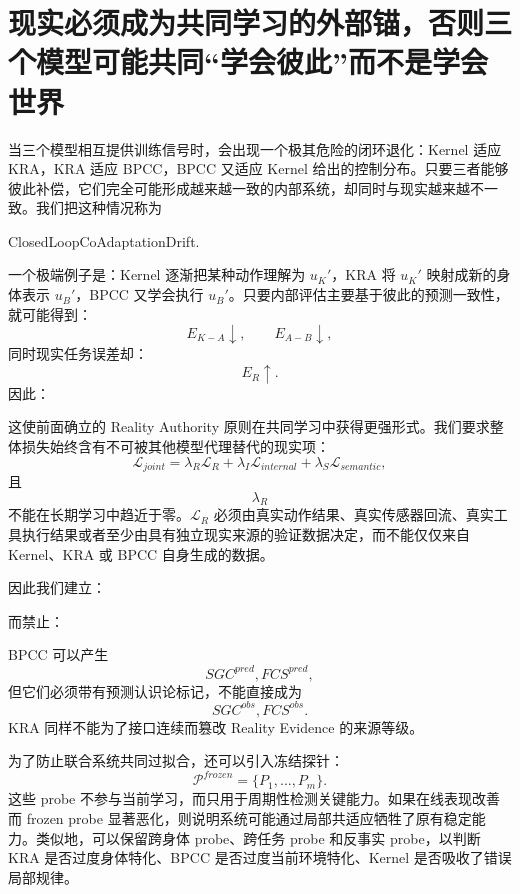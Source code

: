 \section{现实必须成为共同学习的外部锚，否则三个模型可能共同“学会彼此”而不是学会世界}

当三个模型相互提供训练信号时，会出现一个极其危险的闭环退化：Kernel 适应 KRA，KRA 适应 BPCC，BPCC 又适应 Kernel 给出的控制分布。只要三者能够彼此补偿，它们完全可能形成越来越一致的内部系统，却同时与现实越来越不一致。我们把这种情况称为
\begin{statementbox}
ClosedLoopCoAdaptationDrift.
\end{statementbox}

一个极端例子是：Kernel 逐渐把某种动作理解为 $u_K'$，KRA 将 $u_K'$ 映射成新的身体表示 $u_B'$，BPCC 又学会执行 $u_B'$。只要内部评估主要基于彼此的预测一致性，就可能得到：
\[
E_{K-A}\downarrow,
\qquad
E_{A-B}\downarrow,
\]
同时现实任务误差却：
\[
E_R\uparrow.
\]
因此：
\begin{statementbox}
\centering
{}
\end{statementbox}

这使前面确立的 Reality Authority 原则在共同学习中获得更强形式。我们要求整体损失始终含有不可被其他模型代理替代的现实项：
\[
\mathcal L_{joint}
=
\lambda_R\mathcal L_R
+
\lambda_I\mathcal L_{internal}
+
\lambda_S\mathcal L_{semantic},
\]
且
\[
\lambda_R
\]
不能在长期学习中趋近于零。$\mathcal L_R$ 必须由真实动作结果、真实传感器回流、真实工具执行结果或者至少由具有独立现实来源的验证数据决定，而不能仅仅来自 Kernel、KRA 或 BPCC 自身生成的数据。

因此我们建立：
\begin{statementbox}
\centering
{}
\end{statementbox}
而禁止：
\begin{statementbox}
\centering
{}
\end{statementbox}
BPCC 可以产生
\[
SGC^{pred},
FCS^{pred},
\]
但它们必须带有预测认识论标记，不能直接成为
\[
SGC^{obs},
FCS^{obs}.
\]
KRA 同样不能为了接口连续而篡改 Reality Evidence 的来源等级。

为了防止联合系统共同过拟合，还可以引入冻结探针：
\[
\mathcal P^{frozen}
=
\{P_1,\ldots,P_m\}.
\]
这些 probe 不参与当前学习，而只用于周期性检测关键能力。如果在线表现改善而 frozen probe 显著恶化，则说明系统可能通过局部共适应牺牲了原有稳定能力。类似地，可以保留跨身体 probe、跨任务 probe 和反事实 probe，以判断 KRA 是否过度身体特化、BPCC 是否过度当前环境特化、Kernel 是否吸收了错误局部规律。

